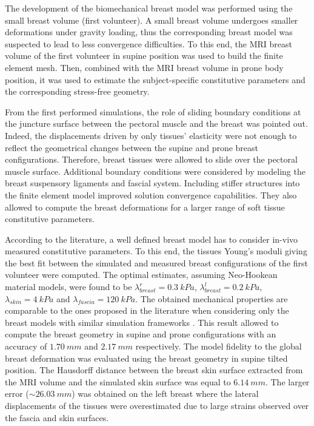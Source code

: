 The development of the biomechanical breast model was performed using the small breast volume (first volunteer). A small breast volume undergoes smaller deformations under gravity loading, thus the corresponding breast model was suspected to lead to less convergence difficulties. To this end, the MRI breast volume of the first volunteer in supine position was used to build the finite element mesh. Then, combined with the MRI breast volume in prone body position, it was used to estimate the subject-specific constitutive parameters and the corresponding stress-free geometry. 
 
 From the first performed simulations, the role of sliding boundary conditions at the juncture surface between  the pectoral muscle and the breast was pointed out. Indeed, the displacements driven by only tissues' elasticity were not enough to reflect the geometrical changes between the supine and prone breast configurations. Therefore, breast tissues were allowed to slide over the pectoral muscle surface. Additional boundary conditions were considered by modeling the breast suspensory ligaments and fascial system. Including stiffer structures into the finite element model improved solution convergence capabilities. They also allowed to compute the breast deformations for a larger range of soft tissue constitutive parameters.
 
 According to the literature, a well defined breast model has to  consider in-vivo measured constitutive parameters. To this end, the tissues Young's moduli giving the best fit between the simulated and measured breast configurations of the first volunteer were computed. The optimal estimates, assuming Neo-Hookean material models, were found to be $\lambda_{breast}^r=0.3\ kPa$, $\lambda_{breast}^l=0.2\ kPa$, $\lambda_{skin}=4\ kPa$ and $\lambda_{fascia}=120\ kPa$. The obtained mechanical properties are comparable to the ones proposed in the literature when considering only the breast models with similar simulation frameworks  \citep{rajagopal_modelling_2007, gamage_modelling_2012, griesenauer_breast_2017}. This result allowed to compute the breast geometry in supine and prone configurations with an accuracy of $1.70\ mm$ and $2.17\ mm$ respectively. The model fidelity to the global breast deformation was evaluated using the breast geometry in supine tilted position. The Hausdorff distance between the breast skin surface extracted from the MRI volume and the simulated skin surface was equal to $6.14 \ mm$. The larger error ($\sim 26.03 \ mm$) was obtained on the left breast where the lateral displacements of the tissues were overestimated due to large strains observed over the fascia and skin surfaces. 
 
